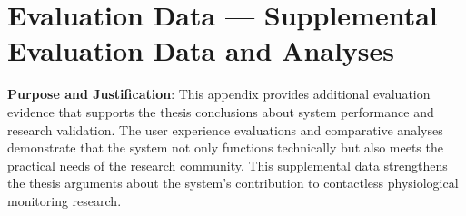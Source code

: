 \chapter{Evaluation Data — Supplemental Evaluation Data and Analyses}

\textbf{Purpose and Justification}: This appendix provides additional evaluation evidence that supports the thesis conclusions about system performance and research validation. The user experience evaluations and comparative analyses demonstrate that the system not only functions technically but also meets the practical needs of the research community. This supplemental data strengthens the thesis arguments about the system's contribution to contactless physiological monitoring research.


